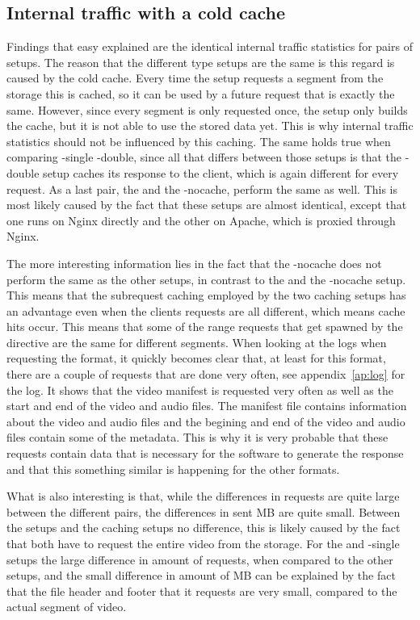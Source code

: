 \documentclass[twoside,openright]{uva-bachelor-thesis}
\begin{document}
\subsection{Internal traffic with a cold cache}
Findings that easy explained are the identical internal traffic statistics for
pairs of setups. The reason that the different \cdn type setups are the same is
this regard is caused by the cold cache. Every time the \cdn setup requests a
segment from the storage this is cached, so it can be used by a future request
that is exactly the same. However, since every segment is only requested once,
the \cdn setup only builds the cache, but it is not able to use the stored data
yet. This is why internal traffic statistics should not be influenced by this
caching. The same holds true when comparing \lt-single \lt-double, since all
that differs between those setups is that the \lt-double setup caches its
response to the client, which is again different for every request. As a last
pair, the \ipp and the \lt-nocache, perform the same as well. This is most
likely caused by the fact that these setups are almost identical, except that
one runs on Nginx directly and the other on Apache, which is proxied through
Nginx.

The more interesting information lies in the fact that the \lt-nocache does not
perform the same as the other \lt setups, in contrast to the \cdn and the
\cdn-nocache setup. This means that the subrequest caching employed by the two
caching \lt setups has an advantage even when the clients requests are all
different, which means cache hits occur. This means that some of the range
requests that get spawned by the \ipp directive are the same for different
segments. When looking at the logs when requesting the \iss format, it quickly
becomes clear that, at least for this format, there are a couple of requests
that are done very often, see appendix~\ref{ap:log} for the log. It shows that
the video manifest is requested very often as well as the start and end of the
video and audio files. The manifest file contains information about the video
and audio files and the begining and end of the video and audio files contain
some of the metadata. This is why it is very probable that these requests
contain data that is necessary for the \usp software to generate the \iss
response and that this something similar is happening for the other formats.

What is also interesting is that, while the differences in requests are quite
large between the different pairs, the differences in sent MB are quite small.
Between the \cdn setups and the caching \lt setups no difference, this is likely
caused by the fact that both have to request the entire video from the storage.
For the \ipp and \lt-single setups the large difference in amount of requests,
when compared to the other setups, and the small difference in amount of MB can
be explained by the fact that the file header and footer that it requests are
very small, compared to the actual segment of video.
\end{document}

